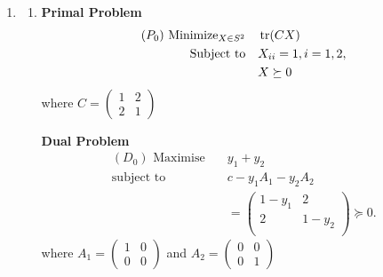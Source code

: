 \begin{enumerate}
    \item \begin{enumerate}[label=(\alph*)]
              \item \begin{minipage}[t]{0.45\textwidth}
                        \textbf{Primal Problem}
                        \begin{align*}
                            (P_0) \text{ Minimize}_{X \in S^2} \quad & \tr(CX)               \\
                            \text{Subject to} \quad                  & X_{ii} = 1, i = 1, 2, \\
                                                                     & X \succeq 0
                        \end{align*}
                        where \(C = \begin{pmatrix}
                            1 & 2 \\ 2 & 1
                        \end{pmatrix}\)
                    \end{minipage}
                    \hfill
                    \begin{minipage}[t]{0.45\textwidth}
                        \textbf{Dual Problem}
                        \begin{align*}
                            (D_0) \text{ Maximise} \quad & y_1 + y_2           \\
                            \text{subject to} \quad      & c - y_1A_1 - y_2A_2 \\ &= \begin{pmatrix}
                                1 - y_1 & 2       \\
                                2       & 1 - y_2 \\
                            \end{pmatrix} \succeq 0.
                        \end{align*}
                        where \(A_1 = \begin{pmatrix}
                            1 & 0 \\ 0 & 0
                        \end{pmatrix}\) and \(A_2 = \begin{pmatrix}
                            0 & 0 \\ 0 & 1
                        \end{pmatrix}\)

\end{minipage}
\end{enumerate}
\end{enumerate}

